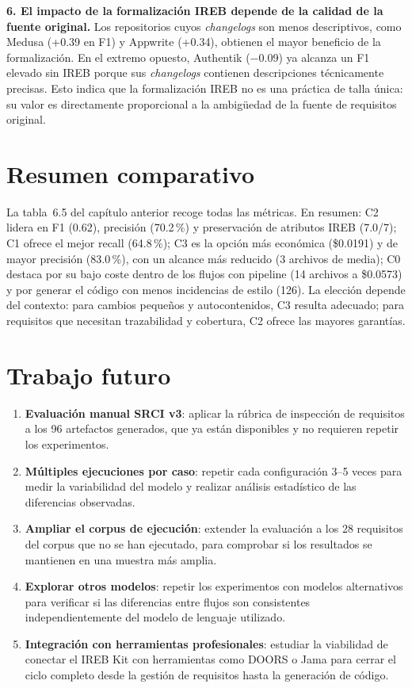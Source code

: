 \textbf{6. El impacto de la formalizaci\'on IREB depende de la calidad de la fuente original.} Los repositorios cuyos \emph{changelogs} son menos descriptivos, como Medusa (+0.39 en F1) y Appwrite (+0.34), obtienen el mayor beneficio de la formalizaci\'on. En el extremo opuesto, Authentik ($-$0.09) ya alcanza un F1 elevado sin IREB porque sus \emph{changelogs} contienen descripciones t\'ecnicamente precisas. Esto indica que la formalizaci\'on IREB no es una pr\'actica de talla \'unica: su valor es directamente proporcional a la ambig\"uedad de la fuente de requisitos original.

\section{Resumen comparativo}

La tabla~6.5 del cap\'itulo anterior recoge todas las m\'etricas. En resumen: C2 lidera en F1 (0.62), precisi\'on (70.2\,\%) y preservaci\'on de atributos IREB (7.0/7); C1 ofrece el mejor recall (64.8\,\%); C3 es la opci\'on m\'as econ\'omica (\$0.0191) y de mayor precisi\'on (83.0\,\%), con un alcance m\'as reducido (3 archivos de media); C0 destaca por su bajo coste dentro de los flujos con pipeline (14 archivos a \$0.0573) y por generar el c\'odigo con menos incidencias de estilo (126). La elecci\'on depende del contexto: para cambios peque\~nos y autocontenidos, C3 resulta adecuado; para requisitos que necesitan trazabilidad y cobertura, C2 ofrece las mayores garant\'ias.

\section{Trabajo futuro}

\begin{enumerate}
    \item \textbf{Evaluaci\'on manual SRCI v3}: aplicar la r\'ubrica de inspecci\'on de requisitos a los 96 artefactos generados, que ya est\'an disponibles y no requieren repetir los experimentos.

    \item \textbf{M\'ultiples ejecuciones por caso}: repetir cada configuraci\'on 3--5 veces para medir la variabilidad del modelo y realizar an\'alisis estad\'istico de las diferencias observadas.

    \item \textbf{Ampliar el corpus de ejecuci\'on}: extender la evaluaci\'on a los 28 requisitos del corpus que no se han ejecutado, para comprobar si los resultados se mantienen en una muestra m\'as amplia.

    \item \textbf{Explorar otros modelos}: repetir los experimentos con modelos alternativos para verificar si las diferencias entre flujos son consistentes independientemente del modelo de lenguaje utilizado.

    \item \textbf{Integraci\'on con herramientas profesionales}: estudiar la viabilidad de conectar el IREB Kit con herramientas como DOORS o Jama para cerrar el ciclo completo desde la gesti\'on de requisitos hasta la generaci\'on de c\'odigo.
\end{enumerate}

